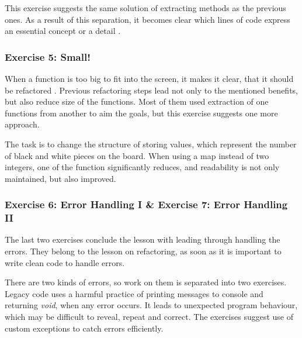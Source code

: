     This exercise suggests the same solution of extracting methods as the previous ones. As a result of this separation, it becomes clear which lines of code express an essential concept or a detail \cite[One Level of Abstraction per Function]{clean_code}.
    
    \subsubsection{Exercise 5: Small!}
    When a function is too big to fit into the screen, it makes it clear, that it should be refactored \cite[Small!]{clean_code}. Previous refactoring steps lead not only to the mentioned benefits, but also reduce size of the functions. Most of them used extraction of one functions from another to aim the goals, but this exercise suggests one more approach.
    
    The task is to change the structure of storing values, which represent the number of black and white pieces on the board. When using a map instead of two integers, one of the function significantly reduces, and readability is not only maintained, but also improved.
    
    \subsubsection{Exercise 6: Error Handling I \& Exercise 7: Error Handling II}
    The last two exercises conclude the lesson with leading through handling the errors. They belong to the lesson on refactoring, as soon as it is important to write clean code to handle errors.
    
    There are two kinds of errors, so work on them is separated into two exercises. Legacy code uses a harmful practice of printing messages to console and returning \textit{void}, when any error occurs. It leads to unexpected program behaviour, which may be difficult to reveal, repeat and correct. The exercises suggest use of custom exceptions to catch errors efficiently.
